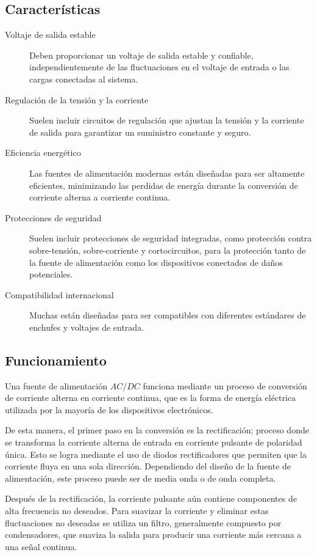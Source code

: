 \documentclass[letter,twoside,11pt]{article}
\begin{document}
\subsection{Características}

\begin{description}
    \item [Voltaje de salida estable] Deben proporcionar un voltaje de salida
    estable y confiable, independientemente de las fluctuaciones en el voltaje
    de entrada o las cargas conectadas al sistema.
    \item [Regulación de la tensión y la corriente] Suelen incluir circuitos de
    regulación que ajustan la tensión y la corriente de salida para garantizar
    un suministro constante y seguro.
    \item [Eficiencia energético] Las fuentes de alimentación modernas están
    diseñadas para ser altamente eficientes, minimizando las perdidas de energía
    durante la conversión de corriente alterna a corriente continua.
    \item [Protecciones de seguridad] Suelen incluir protecciones de seguridad
    integradas, como protección contra sobre-tensión, sobre-corriente y
    cortocircuitos, para la protección tanto de la fuente de alimentación como
    los dispositivos conectados de daños potenciales.
    \item [Compatibilidad internacional] Muchas están diseñadas para ser
    compatibles con diferentes estándares de enchufes y voltajes de entrada.
\end{description}

\subsection{Funcionamiento}
Una fuente de alimentación $AC/DC$ funciona mediante un proceso de conversión de
corriente alterna en corriente continua, que es la forma de energía eléctrica
utilizada por la mayoría de los dispositivos electrónicos.

De esta manera, el primer paso en la conversión es la rectificación; proceso
donde se transforma la corriente alterna de entrada en corriente pulsante de
polaridad única. Esto se logra mediante el uso de diodos rectificadores que
permiten que la corriente fluya en una sola dirección. Dependiendo del diseño de
la fuente de alimentación, este proceso puede ser de media onda o de onda
completa.

Después de la rectificación, la corriente pulsante aún contiene componentes de
alta frecuencia no deseados. Para suavizar la corriente y eliminar estas
fluctuaciones no deseadas se utiliza un filtro, generalmente compuesto por
condensadores, que suaviza la salida para producir una corriente más cercana a
una señal continua.
\end{document}
